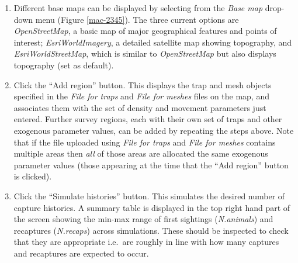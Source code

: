\documentclass[a4paper,11pt]{article} %
\begin{document}
\begin{enumerate}
\begin{enumerate}
\end{enumerate}
\item Different base maps can be displayed by selecting from the \textit{Base map} drop-down menu (Figure \ref{mac-2345}). The three current options are \textit{OpenStreetMap}, a basic map of major geographical features and points of interest; \textit{EsriWorldImagery}, a detailed satellite map showing topography, and \textit{EsriWorldStreetMap}, which is similar to \textit{OpenStreetMap} but also displays topography (set as default).  
\item Click the ``Add region'' button. This displays the trap and mesh objects specified in the \textit{File for traps} and \textit{File for meshes} files on the map, and associates them with the set of density and movement parameters just entered. Further survey regions, each with their own set of traps and other exogenous parameter values, can be added by repeating the steps above. Note that if the file uploaded using \textit{File for traps} and \textit{File for meshes} contains multiple areas then {\it all} of those areas are allocated the same exogenous parameter values (those appearing at the time that the ``Add region'' button is clicked).
\item Click the ``Simulate histories'' button. This simulates the desired number of capture histories. A summary table is displayed in the top right hand part of the screen showing the min-max range of first sightings (\textit{N.animals}) and recaptures (\textit{N.recaps}) across simulations. These should be inspected to check that they are appropriate i.e.\ are roughly in line with how many captures and recaptures are expected to occur. 

\end{enumerate}
\end{document}
